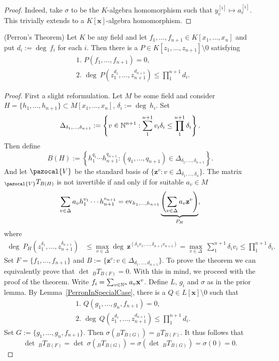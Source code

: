     \begin{proof}
        Indeed, take $\sigma$ to be the $K$-algebra homomorphism such that $y_v^{[i]}\mapsto a_v^{[i]}$. This trivially extends to a $K[\mathbf{x}]$-algebra homomorphism. 
    \end{proof}
    \begin{theorem}(Perron's Theorem) Let $K$ be any field and let $f_1,\dots,f_{n+1}\in K[x_1,\dots,x_{n}]$ and put $d_i := \deg \ f_i$ for each $i$. Then there is a $P\in K[z_1,\dots,z_{n+1}]\setminus 0$ satisfying 
    \begin{align*}
        &\text{1. } P(f_1,\dots,f_{n+1}) = 0,\\
        &\text{2. } \deg \ P(z_1^{d_1},\dots,z_{n+1}^{d_{n+1}}) \leq \prod_1^{n+1} d_i.
    \end{align*}
    \end{theorem}
    \begin{proof}
        First a slight reformulation. Let $M$ be some field and consider $H=\{h_1,\dots,h_{n+1}\} \subset M[x_1,\dots,x_n]$, $\delta_i:=\deg\ h_i$. Set $$\Delta_{\delta_1,\dots,\delta_{n+1}}:=\left\{ v\in \mathbb{N}^{n+1} : \sum_1^{n+1} v_i\delta_i \leq \prod_1^{n+1} \delta_i\right\}.$$
        Then define 
        $$B(H) := \left\{ h_1^{q_1}\cdots h_{n+1}^{q_{n+1}} : (q_1,\dots,q_{n+1})\in \Delta_{\delta_1,\dots,\delta_{n+1}}\right\}.$$
        And let $\pazocal{V}$ be the standard basis of $\{\mathbf{z}^v : v\in \Delta_{\delta_1,\dots,\delta_n}\}$. The matrix $_\pazocal{V}T_{B(H)}$ is not invertible if and only if for suitable $a_v\in M$
        $$\sum_{v\in \Delta } a_vh_1^{v_1}\cdots h_{n+1}^{v_{n+1}} = \mathrm{ev}_{h_1,\dots,h_{n+1}}\underbrace{\left(\sum_{v\in\Delta} a_v\mathbf{z}^v\right)}_{P_H},$$
        where 
        \begin{align*}
        \deg \ P_H(z_1^{\delta_1},\dots,z_{n+1}^{\delta_{n+1}}) &\leq \max_{v\in \Delta} \deg \ \mathbf{z}^{(\delta_1v_1,\dots,\delta_{n+1}v_{n+1})} = \max_{v\in\Delta}\ \sum_1^{n+1} \delta_iv_i \leq \prod_1^{n+1}\delta_i.
        \end{align*}
        Set $F=\{f_1,\dots,f_{n+1}\}$ and $B := \{\mathbf{z}^v : v\in \Delta_{d_1,\dots,d_{n+1}}\}$. To prove the theorem we can equivalently prove that $\det \ _BT_{B(F)}=0$. With this in mind, we proceed with the proof of the theorem. Write $f_i = \sum_{v\in\mathbb{N}^n} a_v\mathbf{x}^v$. Define $L$, $g_i$ and $\sigma$ as in the prior lemma. By Lemma~\ref{PerronInSpecialCase}, there is a $Q\in L[\mathbf{x}]\setminus 0$ such that 
        \begin{align*}
            &\text{1. } Q(g_1,\dots,g_n,f_{n+1}) =0,\\
            &\text{2. } \deg \ Q(z_1^{d_1},\dots,z_{n+1}^{d_{n+1}}) \leq \prod_1^{n+1} d_i.
        \end{align*}
        Set $G := \{g_1,\dots,g_n,f_{n+1}\}$. Then $\sigma(_BT_{B(G)}) = {_B}T_{B(F)}$. It thus follows that 
        $$\det \ {_B}T_{B(F)} = \det \ \sigma(_BT_{B(G)}) = \sigma(\det\ _BT_{B(G)})= \sigma(0)=0.$$ 
    \end{proof}
